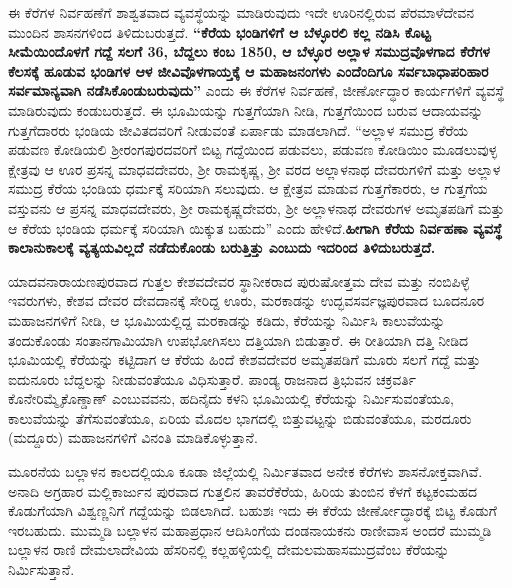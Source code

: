 ಈ ಕೆರೆಗಳ ನಿರ್ವಹಣೆಗೆ ಶಾಶ್ವತವಾದ ವ್ಯವಸ್ಥೆಯನ್ನು ಮಾಡಿರುವುದು ಇದೇ ಊರಿನಲ್ಲಿರುವ ಪೆರಮಾಳೆದೇವನ ಮುಂದಿನ ಶಾಸನಗಳಿಂದ ತಿಳಿದುಬರುತ್ತದೆ. \textbf{“ಕೆರೆಯ ಭಂಡಿಗಳಿಗೆ ಆ ಬೆಳ್ಳೂರಲಿ ಕಲ್ಲ ನಡಿಸಿ ಕೊಟ್ಟ ಸೀಮೆಯಿಂದೊಳಗೆ ಗದ್ದೆ ಸಲಗೆ 36, ಬೆದ್ದಲು ಕಂಬ 1850, ಆ ಬೆಳ್ಳೂರ ಅಲ್ಲಾಳ ಸಮುದ್ರವೊಳಗಾದ ಕೆರೆಗಳ ಕೆಲಸಕ್ಕೆ ಹೂಡುವ ಭಂಡಿಗಳ ಆಳ ಜೀವಿವೊಳಗಾಯ್ತಕ್ಕೆ ಆ ಮಹಾಜನಂಗಳು ಎಂದೆಂದಿಗೂ ಸರ್ವಬಾಧಾಪರಿಹಾರ ಸರ್ವಮಾನ್ಯವಾಗಿ ನಡೆಸಿಕೊಂಡುಬರುವುದು”} ಎಂದು ಈ ಕೆರೆಗಳ ನಿರ್ವಹಣೆ, ಜೀರ್ಣೋದ್ಧಾರ ಕಾರ್ಯಗಳಿಗೆ ವ್ಯವಸ್ಥೆ ಮಾಡಿರುವುದು ಕಂಡುಬರುತ್ತದೆ. ಈ ಭೂಮಿಯನ್ನು ಗುತ್ತಗೆಯಾಗಿ ನೀಡಿ, ಗುತ್ತಗೆಯಿಂದ ಬರುವ ಆದಾಯವನ್ನು ಗುತ್ತಗೆದಾರರು ಭಂಡಿಯ ಜೀವಿತದವರಿಗೆ ನೀಡುವಂತೆ ಏರ್ಪಾಡು ಮಾಡಲಾಗಿದೆ. “ಅಲ್ಲಾಳ ಸಮುದ್ರ ಕೆರೆಯ ಪಡುವಣ ಕೋಡಿಯಲಿ ಶ‍್ರೀರಂಗಪುರದವರಿಗೆ ಬಿಟ್ಟ ಗದ್ದೆಯಿಂದ ಪಡುವಲು, ಪಡುವಣ ಕೋಡಿಯಿಂ ಮೂಡಲುವುಳ್ಳ ಕ್ಷೇತ್ರವು ಆ ಊರ ಪ್ರಸನ್ನ ಮಾಧವದೇವರು, ಶ‍್ರೀ ರಾಮಕೃಷ್ಣ, ಶ‍್ರೀ ವರದ ಅಲ್ಲಾಳನಾಥ ದೇವರುಗಳಿಗೆ ಮತ್ತು ಅಲ್ಲಾಳ ಸಮುದ್ರ ಕೆರೆಯ ಭಂಡಿಯ ಧರ್ಮಕ್ಕೆ ಸರಿಯಾಗಿ ಸಲುವುದು. ಆ ಕ್ಷೇತ್ರವ ಮಾಡುವ ಗುತ್ತಗೆಕಾರರು, ಆ ಗುತ್ತಗೆಯ ವಸ್ತುವನು ಆ ಪ್ರಸನ್ನ ಮಾಧವದೇವರು, ಶ‍್ರೀ ರಾಮಕೃಷ್ಣದೇವರು, ಶ‍್ರೀ ಅಲ್ಲಾಳನಾಥ ದೇವರುಗಳ ಅಮೃತಪಡಿಗೆ ಮತ್ತು ಆ ಕೆರೆಯ ಭಂಡಿಯ ಧರ್ಮಕ್ಕೆ ಸರಿಯಾಗಿ ಯಿಕ್ಕುತ ಬಹುದು” ಎಂದು ಹೇಳಿದೆ.\textbf{ಹೀಗಾಗಿ ಕೆರೆಯ ನಿರ್ವಹಣಾ ವ್ಯವಸ್ಥೆ ಕಾಲಾನುಕಾಲಕ್ಕೆ ವ್ಯತ್ಯಯವಿಲ್ಲದೆ ನಡೆದುಕೊಂಡು ಬರುತ್ತಿತ್ತು ಎಂಬುದು ಇದರಿಂದ ತಿಳಿದುಬರುತ್ತದೆ. }

ಯಾದವನಾರಾಯಣಪುರವಾದ ಗುತ್ತಲ ಕೇಶವದೇವರ ಸ್ಥಾನೀಕರಾದ ಪುರುಷೋತ್ತಮ ದೇವ ಮತ್ತು ನಂಬಿಪಿಳ್ಳೆ ಇವರುಗಳು, ಕೇಶವ ದೇವರ ದೇವದಾನಕ್ಕೆ ಸೇರಿದ್ದ ಊರು, ಮರಕಾಡನ್ನು ಉದ್ಭವಸರ್ವಜ್ಞಪುರವಾದ ಬೂದನೂರ ಮಹಾಜನ\-ಗಳಿಗೆ ನೀಡಿ, ಆ ಭೂಮಿಯಲ್ಲಿದ್ದ ಮರಕಾಡನ್ನು ಕಡಿದು, ಕೆರೆಯನ್ನು ನಿರ್ಮಿಸಿ ಕಾಲುವೆಯನ್ನು ತಂದುಕೊಂಡು ಸಂತಾನಗಾಮಿ\-ಯಾಗಿ ಉಪಭೋಗಿಸಲು ದತ್ತಿಯಾಗಿ ಬಿಡುತ್ತಾರೆ. ಈ ರೀತಿಯಾಗಿ ದತ್ತಿ ನೀಡಿದ ಭೂಮಿಯಲ್ಲಿ ಕೆರೆಯನ್ನು ಕಟ್ಟಿದಾಗ ಆ ಕೆರೆಯ ಹಿಂದೆ ಕೇಶವದೇವರ ಅಮೃತಪಡಿಗೆ ಮೂರು ಸಲಗೆ ಗದ್ದೆ ಮತ್ತು ಐದುನೂರು ಬೆದ್ದಲನ್ನು ನೀಡುವಂತೆಯೂ ವಿಧಿಸುತ್ತಾರೆ. ಪಾಂಡ್ಯ ರಾಜನಾದ ತ್ರಿಭುವನ ಚಕ್ರವರ್ತಿ ಕೊನೇರಿಮ್ಮೈಕೊಣ್ಡಾಣ್​ ಎಂಬುವವನು, ಹದಿನೈದು ಕಳನಿ ಭೂಮಿಯಲ್ಲಿ ಕೆರೆಯನ್ನು ನಿರ್ಮಿಸುವಂತೆಯೂ, ಕಾಲುವೆಯನ್ನು ತೆಗೆಸುವಂತೆಯೂ, ಏರಿಯ ಮೊದಲ ಭಾಗದಲ್ಲಿ ಬಿತ್ತುವಟ್ಟನ್ನು ಬಿಡುವಂತೆಯೂ, ಮರದೂರು (ಮದ್ದೂರು) ಮಹಾಜನಗಳಿಗೆ ವಿನಂತಿ ಮಾಡಿಕೊಳ್ಳುತ್ತಾನೆ.

ಮೂರನೆಯ ಬಲ್ಲಾಳನ ಕಾಲದಲ್ಲಿಯೂ ಕೂಡಾ ಜಿಲ್ಲೆಯಲ್ಲಿ ನಿರ್ಮಿತವಾದ ಅನೇಕ ಕೆರೆಗಳು ಶಾಸನೋಕ್ತವಾಗಿವೆ. ಅನಾದಿ ಅಗ್ರಹಾರ ಮಲ್ಲಿಕಾರ್ಜುನ ಪುರವಾದ ಗುತ್ತಲಿನ ತಾವರೆಕೆರೆಯ, ಹಿರಿಯ ತುಂಬಿನ ಕೆಳಗೆ ಕಟ್ಟಕಂಮಹದ ಕೊಡುಗೆಯಾಗಿ ವಿಶ್ವಣ್ಣನಿಗೆ ಗದ್ದೆಯನ್ನು ಬಿಡಲಾಗಿದೆ. ಬಹುಶಃ ಇದು ಈ ಕೆರೆಯ ಜೀರ್ಣೋದ್ಧಾರಕ್ಕೆ ಬಿಟ್ಟ ಕೊಡುಗೆ ಇರಬಹುದು. ಮುಮ್ಮಡಿ ಬಲ್ಲಾಳನ ಮಹಾಪ್ರಧಾನ ಆದಿಸಿಂಗೆಯ ದಂಡನಾಯಕನು ರಾಣೀವಾಸ ಅಂದರೆ ಮುಮ್ಮಡಿ ಬಲ್ಲಾಳನ ರಾಣಿ ದೇಮಲಾದೇವಿಯ ಹೆಸರಿನಲ್ಲಿ ಕಲ್ಲಹಳ್ಳಿಯಲ್ಲಿ ದೇಮಲಮಹಾಸಮುದ್ರವೆಂಬ ಕೆರೆಯನ್ನು ನಿರ್ಮಿಸುತ್ತಾನೆ.

